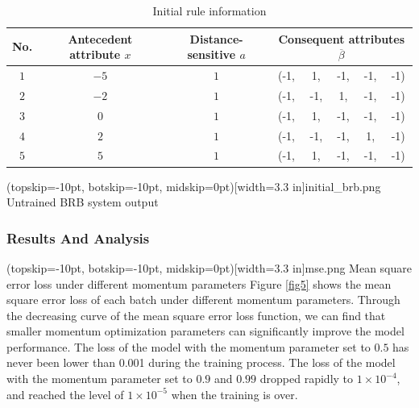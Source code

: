 \documentclass{ieeeaccess}
\begin{document}
\begin{table}
    \caption{Initial rule information}
    \centering
    \normalsize
    \label{tab1}
    \begin{tabular}{cccccccc}
        \hline
        No. & Antecedent attribute $x$ & Distance-sensitive $a$ & \multicolumn{5}{c}{Consequent attributes $\overline{\beta}$}                         \\
        \hline
        $1$ & $-5$                     & $1$                    & (-1,                                                         & 1,  & -1, & -1, & -1) \\
        $2$ & $-2$                     & $1$                    & (-1,                                                         & -1, & 1,  & -1, & -1) \\
        $3$ & $0$                      & $1$                    & (-1,                                                         & 1,  & -1, & -1, & -1) \\
        $4$ & $2$                      & $1$                    & (-1,                                                         & -1, & -1, & 1,  & -1) \\
        $5$ & $5$                      & $1$                    & (-1,                                                         & 1,  & -1, & -1, & -1) \\
        \hline
    \end{tabular}
\end{table}

\Figure[!t](topskip=-10pt, botskip=-10pt, midskip=0pt)[width=3.3 in]{initial_brb.png}
{Untrained BRB system output\label{fig4}}

\subsubsection{Results And Analysis}
\Figure[!t](topskip=-10pt, botskip=-10pt, midskip=0pt)[width=3.3 in]{mse.png}
{Mean square error loss under different momentum parameters\label{fig5}}
Figure \ref{fig5} shows the mean square error loss of each batch under different momentum parameters.
Through the decreasing curve of the mean square error loss function,
we can find that smaller momentum optimization parameters can significantly improve the model performance.
The loss of the model with the momentum parameter set to $0.5$ has never been lower than 0.001 during the training process.
The loss of the model with the momentum parameter set to $0.9$ and $0.99$ dropped rapidly to $1\times10^{-4}$,
and reached the level of $1\times10^{-5}$ when the training is over.
\end{document}
